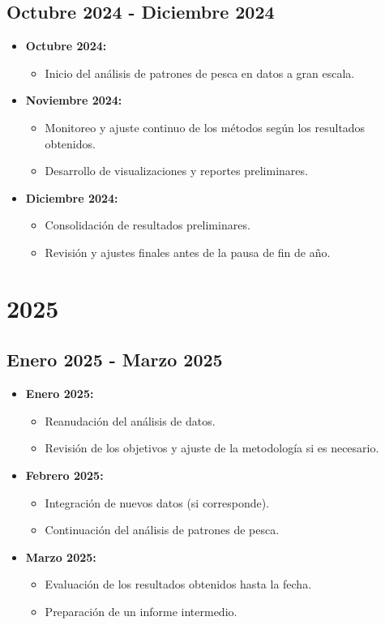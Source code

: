 \subsection{Octubre 2024 - Diciembre 2024}
\begin{itemize}
    \item \textbf{Octubre 2024:}
    \begin{itemize}
        \item Inicio del análisis de patrones de pesca en datos a gran escala.
    \end{itemize}
    
    \item \textbf{Noviembre 2024:}
    \begin{itemize}
        \item Monitoreo y ajuste continuo de los métodos según los resultados obtenidos.
        \item Desarrollo de visualizaciones y reportes preliminares.
    \end{itemize}
    
    \item \textbf{Diciembre 2024:}
    \begin{itemize}
        \item Consolidación de resultados preliminares.
        \item Revisión y ajustes finales antes de la pausa de fin de año.
    \end{itemize}
\end{itemize}

\section{2025}
\subsection{Enero 2025 - Marzo 2025}
\begin{itemize}
    \item \textbf{Enero 2025:}
    \begin{itemize}
        \item Reanudación del análisis de datos.
        \item Revisión de los objetivos y ajuste de la metodología si es necesario.
    \end{itemize}
    
    \item \textbf{Febrero 2025:}
    \begin{itemize}
        \item Integración de nuevos datos (si corresponde).
        \item Continuación del análisis de patrones de pesca.
    \end{itemize}
    
    \item \textbf{Marzo 2025:}
    \begin{itemize}
        \item Evaluación de los resultados obtenidos hasta la fecha.
        \item Preparación de un informe intermedio.
    \end{itemize}
\end{itemize}

